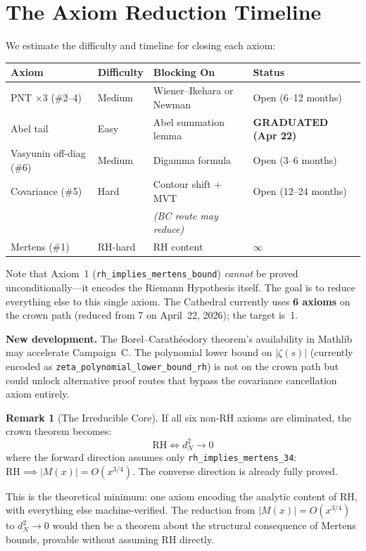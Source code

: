 \documentclass[11pt,a4paper]{article}
\theoremstyle{definition}
\newtheorem{remark}[definition]{Remark}
\newcommand{\RH}{\mathrm{RH}}
\newcommand{\lean}[1]{\texttt{#1}}
\begin{document}
\section{The Axiom Reduction Timeline}
\label{sec:timeline}

We estimate the difficulty and timeline for closing each axiom:

\begin{center}
\small
\begin{tabular}{@{}llll@{}}
\toprule
\textbf{Axiom} & \textbf{Difficulty} & \textbf{Blocking On} & \textbf{Status} \\
\midrule
PNT $\times 3$ (\#2--4) & Medium & Wiener--Ikehara or Newman & Open (6--12 months) \\
\rowcolor{green!10}
Abel tail & Easy & Abel summation lemma & \textbf{GRADUATED (Apr 22)} \\
Vasyunin off-diag (\#6) & Medium & Digamma formula & Open (3--6 months) \\
Covariance (\#5) & Hard & Contour shift + MVT & Open (12--24 months) \\
& & \textit{(BC route may reduce)} & \\
Mertens (\#1) & RH-hard & RH content & $\infty$ \\
\bottomrule
\end{tabular}
\end{center}

Note that Axiom~1 (\lean{rh\_implies\_mertens\_bound}) \emph{cannot} be
proved unconditionally---it encodes the Riemann Hypothesis itself.
The goal is to reduce everything else to this single axiom. The
Cathedral currently uses \textbf{6 axioms} on the crown path (reduced from 7
on April~22, 2026); the target is~1.

\textbf{New development.} The Borel--Carath\'eodory theorem's availability
in Mathlib may accelerate Campaign~C. The polynomial lower bound on
$|\zeta(s)|$ (currently encoded as \lean{zeta\_polynomial\_lower\_bound\_rh})
is not on the crown path but could unlock alternative proof routes that
bypass the covariance cancellation axiom entirely.

\begin{remark}[The Irreducible Core]
If all six non-RH axioms are eliminated, the crown theorem becomes:
\[
  \RH \iff d_N^2 \to 0
\]
where the forward direction assumes only
\lean{rh\_implies\_mertens\_34}: $\RH \implies |M(x)| = O(x^{3/4})$.
The converse direction is already fully proved.

This is the theoretical minimum: one axiom encoding the analytic content
of RH, with everything else machine-verified. The reduction from
$|M(x)| = O(x^{3/4})$ to $d_N^2 \to 0$ would then be a theorem about
the structural consequence of Mertens bounds, provable without assuming
RH directly.
\end{remark}
\end{document}
